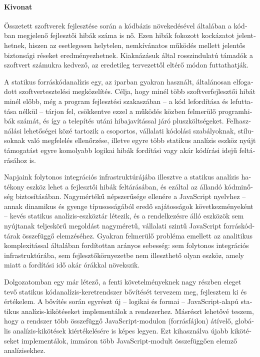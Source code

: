 \begin{otherlanguage}{magyar}

\paragraph*{Kivonat}
{}
\thispagestyle{plain}

Összetett szoftverek fejlesztése során a kódbázis növekedésével általában a kódban megjelenő fejlesztői hibák száma is nő. Ezen hibák fokozott kockázatot jelenthetnek, hiszen az esetlegesen helytelen, nemkívánatos működés mellett jelentős biztonsági réseket eredményezhetnek. Kiaknázásuk által rosszindulatú támadók a szoftvert számukra kedvező, az eredetileg tervezettől eltérő módon futtathatják.

A statikus forráskódanalízis egy, az iparban gyakran használt, általánosan elfogadott szoftvertesztelési megközelítés. Célja, hogy minél több szoftverfejlesztői hibát minél előbb, még a program fejlesztési szakaszában – a kód lefordítása és lefuttatása nélkül – tárjon fel, csökkentve ezzel a működés közben felmerülő programhibák számát, és így a telepítés utáni hibajavítással járó pluszköltségeket. Felhasználási lehetőségei közé tartozik a csoportos, vállalati kódolási szabályoknak, stílusoknak való megfelelés ellenőrzése, illetve egyre több statikus analízis eszköz nyújt támogatást egyre komolyabb logikai hibák fordítási vagy akár kódírási idejű feltárásához is.

Napjaink folytonos integrációs infrastruktúrájába illesztve a statikus analízis hatékony eszköz lehet a fejlesztői hibák feltárásában, és ezáltal az állandó kódminőség biztosításában. Nagymértékű népszerűsége ellenére a JavaScript nyelvhez – annak dinamikus és gyenge típusosságából eredő sajátosságok következményeként – kevés statikus analízis-eszköztár létezik, és a rendelkezésre álló eszközök sem nyújtanak teljeskörű megoldást nagyméretű, vállalati szintű JavaScript forráskódtárak összefüggő elemzéséhez. Gyakran felmerülő probléma emellett az analitikus komplexitással általában fordítottan arányos sebesség: sem folytonos integrációs infrastruktúrába, sem fejlesztőkörnyezetbe nem illeszthető olyan eszköz, amely miatt a fordítási idő akár órákkal növekszik.

Dolgozatomban egy már létező, a fenti követelményeknek nagy részben eleget tevő statikus kódanalízis-keretrendszer bővítését tervezem meg, fejlesztem ki és értékelem. A bővítés során egyrészt új – logikai és formai – JavaScript-alapú statikus analízis-kikötéseket implementálok a rendszerhez. Másrészt lehetővé teszem, hogy a rendszer több összefüggő JavaScript-modulon (forrásfájlon) átívelő, globális analízis-kikötések kiértékelésére is képes legyen. Ezt kihasználva újabb kikötéseket implementálok, immáron több JavaScript-modult összefüggően elemző analízisekhez.

\end{otherlanguage}

